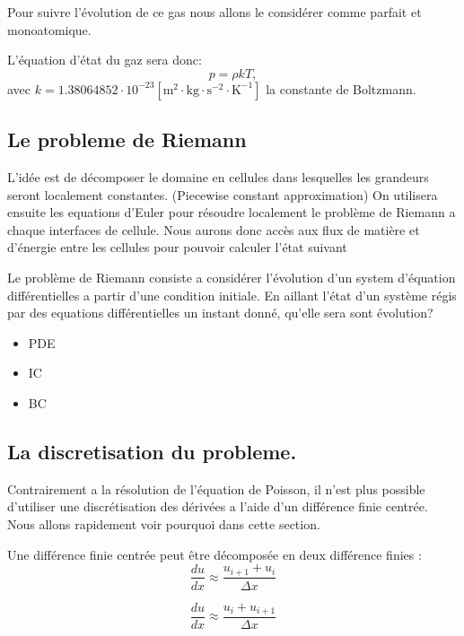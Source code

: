 Pour suivre l'évolution de ce gas nous allons le considérer comme parfait et monoatomique.

L’équation d'état du gaz sera donc:
\begin{equation}
p=\rho k T, 
\end{equation}
avec $k=1.38064852 \cdot 10^{-23} \left[ \mathrm{m^2 \cdot kg \cdot s^{-2} \cdot K^{-1}} \right] $ la constante de Boltzmann.


\subsection{Le probleme de Riemann}
L'idée est de décomposer le domaine en cellules dans lesquelles les grandeurs seront localement constantes. (Piecewise constant approximation)
On utilisera ensuite les equations d'Euler pour résoudre localement le problème de Riemann a chaque interfaces de cellule.
Nous aurons donc accès aux flux de matière et d'énergie entre les cellules pour pouvoir calculer l'état suivant  


Le problème de Riemann consiste a considérer l’évolution d'un system d’équation différentielles a partir d'une condition initiale.
En aillant l’état d'un système régis par des equations différentielles un instant donné, qu'elle sera sont évolution?

\begin{itemize}
\item PDE
\item IC
\item BC
\end{itemize}

\subsection{La discretisation du probleme.}


Contrairement a la résolution de l’équation de Poisson, il n'est plus possible d'utiliser une discrétisation des dérivées a l'aide d'un différence finie centrée.
Nous allons rapidement voir pourquoi dans cette section.


Une différence finie centrée peut être décomposée en deux différence finies : 
\begin{equation}
\frac{d u}{dx} \approx \frac{u_{i+1}  + u_i}{\Delta x} 
\end{equation}

\begin{equation}
\frac{d u}{dx} \approx \frac{u_i  + u_{i+1}}{\Delta x} 
\end{equation}



